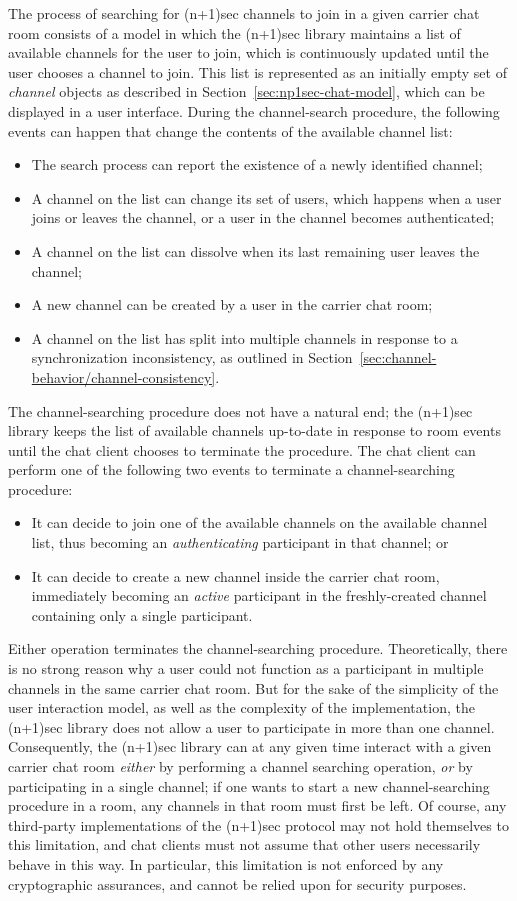 \documentclass{article}
\begin{document}
The process of searching for (n+1)sec channels to join in a given carrier chat room consists of a model in which the (n+1)sec library maintains a list of available channels for the user to join, which is continuously updated until the user chooses a channel to join.
This list is represented as an initially empty set of \emph{channel} objects as described in Section~\ref{sec:np1sec-chat-model}, which can be displayed in a user interface.
During the channel-search procedure, the following events can happen that change the contents of the available channel list:
\begin{itemize}
\item The search process can report the existence of a newly identified channel;
\item A channel on the list can change its set of users, which happens when a user joins or leaves the channel, or a user in the channel becomes authenticated;
\item A channel on the list can dissolve when its last remaining user leaves the channel;
\item A new channel can be created by a user in the carrier chat room;
\item A channel on the list has split into multiple channels in response to a synchronization inconsistency, as outlined in Section~\ref{sec:channel-behavior/channel-consistency}.
\end{itemize}
The channel-searching procedure does not have a natural end; the (n+1)sec library keeps the list of available channels up-to-date in response to room events until the chat client chooses to terminate the procedure.
The chat client can perform one of the following two events to terminate a channel-searching procedure:
\begin{itemize}
\item It can decide to join one of the available channels on the available channel list, thus becoming an \emph{authenticating} participant in that channel; or
\item It can decide to create a new channel inside the carrier chat room, immediately becoming an \emph{active} participant in the freshly-created channel containing only a single participant.
\end{itemize}
Either operation terminates the channel-searching procedure.
Theoretically, there is no strong reason why a user could not function as a participant in multiple channels in the same carrier chat room.
But for the sake of the simplicity of the user interaction model, as well as the complexity of the implementation, the (n+1)sec library does not allow a user to participate in more than one channel.
Consequently, the (n+1)sec library can at any given time interact with a given carrier chat room \emph{either} by performing a channel searching operation, \emph{or} by participating in a single channel; if one wants to start a new channel-searching procedure in a room, any channels in that room must first be left.
Of course, any third-party implementations of the (n+1)sec protocol may not hold themselves to this limitation, and chat clients must not assume that other users necessarily behave in this way.
In particular, this limitation is not enforced by any cryptographic assurances, and cannot be relied upon for security purposes.
\end{document}
